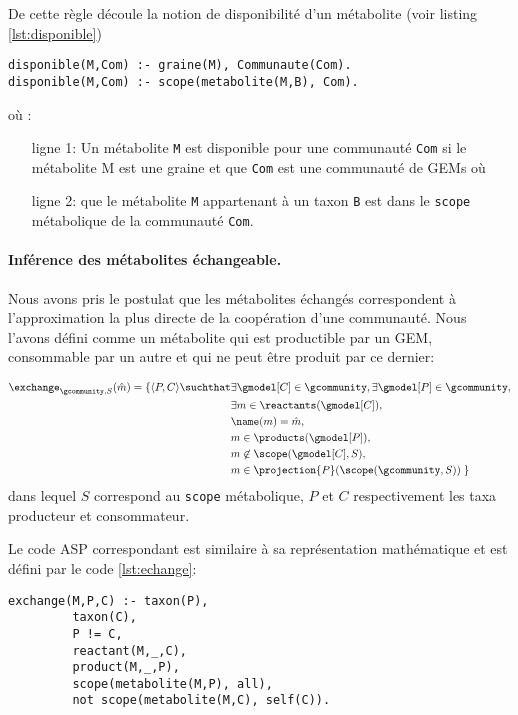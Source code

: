\documentclass[../main.tex]{subfiles}
\begin{document}
De cette règle découle la notion de disponibilité d'un métabolite (voir listing \ref{lst:disponible})

\begin{lstlisting}[mathescape=True, label={lst:disponible}, caption={Code ASP permettant de savoir si un métabolite est disponible},captionpos=b]
disponible(M,Com) :- graine(M), Communaute(Com). 
disponible(M,Com) :- scope(metabolite(M,B), Com).
\end{lstlisting}

où :

\begin{itemize}
	\item[ligne 1:] Un métabolite \texttt{M} est disponible pour une communauté \texttt{Com} si le métabolite M est une graine et que \texttt{Com}  est une communauté de GEMs où
	\item[ligne 2:] que le métabolite \texttt{M} appartenant à un taxon \texttt{B} est dans le \texttt{scope} métabolique de la communauté \texttt{Com}. 
\end{itemize}

\paragraph*{Inférence des métabolites échangeable.} Nous avons pris le postulat que les métabolites échangés correspondent à l'approximation la plus directe de la coopération d'une communauté. Nous l'avons défini comme un métabolite qui est productible par un GEM, consommable par un autre et qui ne peut être produit par ce dernier:

\[
\begin{split}
\exchange_{\gcommunity, S}(\hat{m}) = \{ \langle P, C \rangle \suchthat &
         \exists \gmodel[C]\in\gcommunity,
         \exists \gmodel[P]\in\gcommunity, \\
    &    \exists m \in \reactants(\gmodel[C]), \\
    & \name(m) = \hat{m}, \\
    & m \in \products(\gmodel[P]), \\
    & m \not\in \scope(\gmodel[C],S), \\
    & m \in \projection{P}(\scope(\gcommunity, S)) \;\} \\
\end{split}
\]
dans lequel $S$ correspond au \texttt{scope} métabolique, $P$ et $C$ respectivement les taxa producteur et consommateur.

Le code ASP correspondant est similaire à sa représentation mathématique et est défini par le code \ref{lst:echange}:
\begin{lstlisting}[mathescape=True, label={lst:echange}, caption={Code ASP permettant d'obtenir l'ensemble des métabolites qui sont potentiellement échangés.}, captionpos=b]
exchange(M,P,C) :- taxon(P), 
		 taxon(C),
		 P != C,
		 reactant(M,_,C),
		 product(M,_,P),
		 scope(metabolite(M,P), all),
		 not scope(metabolite(M,C), self(C)).
\end{lstlisting}
\end{document}
